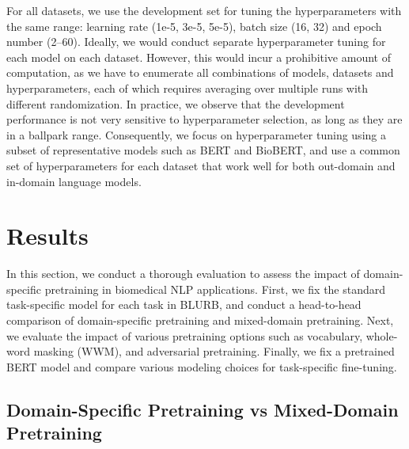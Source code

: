 \documentclass[acmlarge,screen,nonacm]{acmart}
\begin{document}
For all datasets, we use the development set for tuning the hyperparameters with the same range: learning rate (1e-5, 3e-5, 5e-5), batch size (16, 32) and epoch number (2--60). 
Ideally, we would conduct separate hyperparameter tuning for each model on each dataset. However, this would incur a prohibitive amount of computation, as we have to enumerate all combinations of models, datasets and hyperparameters, each of which requires averaging over multiple runs with different randomization. In practice, we observe that the development performance is not very sensitive to hyperparameter selection, as long as they are in a ballpark range. Consequently, we focus on hyperparameter tuning using a subset of representative models such as BERT and BioBERT, and use a common set of hyperparameters for each dataset that work well for both out-domain and in-domain language models.
 \section{Results}
\label{sec:results}


In this section, we conduct a thorough evaluation to assess the impact of domain-specific pretraining in biomedical NLP applications. First, we fix the standard task-specific model for each task in BLURB, and conduct a head-to-head comparison of domain-specific pretraining and mixed-domain pretraining.
Next, we evaluate the impact of various pretraining options such as vocabulary, whole-word masking (WWM), and adversarial pretraining.
Finally, we fix a pretrained BERT model and compare various modeling choices for task-specific fine-tuning.

\subsection{Domain-Specific Pretraining vs Mixed-Domain Pretraining}
\end{document}

